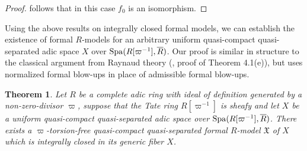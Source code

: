 \documentclass[12pt,twoside,a4paper]{article}
\newtheorem{thm}{Theorem}[section]
\theoremstyle{definition}
\theoremstyle{remark}
\newcommand\Spa{{\rm Spa}}
\begin{document}
\begin{proof}
follows that in this case $f_{0}$ is an isomorphism.\end{proof}
Using the above results on integrally closed formal models, we can establish the existence of formal $R$-models for an arbitrary uniform quasi-compact quasi-separated adic space $X$ over $\Spa(R[\varpi^{-1}], \overline{R})$. Our proof is similar in structure to the classical argument from Raynaud theory (\cite{BL1}, proof of Theorem 4.1(e)), but uses normalized formal blow-ups in place of admissible formal blow-ups.
\begin{thm}\label{Existence of formal models}Let $R$ be a complete adic ring with ideal of definition generated by a non-zero-divisor $\varpi$, suppose that the Tate ring $R[\varpi^{-1}]$ is sheafy and let $X$ be a uniform quasi-compact quasi-separated adic space over $\Spa(R[\varpi^{-1}], \overline{R})$. There exists a $\varpi$-torsion-free quasi-compact quasi-separated formal $R$-model $\mathfrak{X}$ of $X$ which is integrally closed in its generic fiber $X$.\end{thm}
\end{document}

